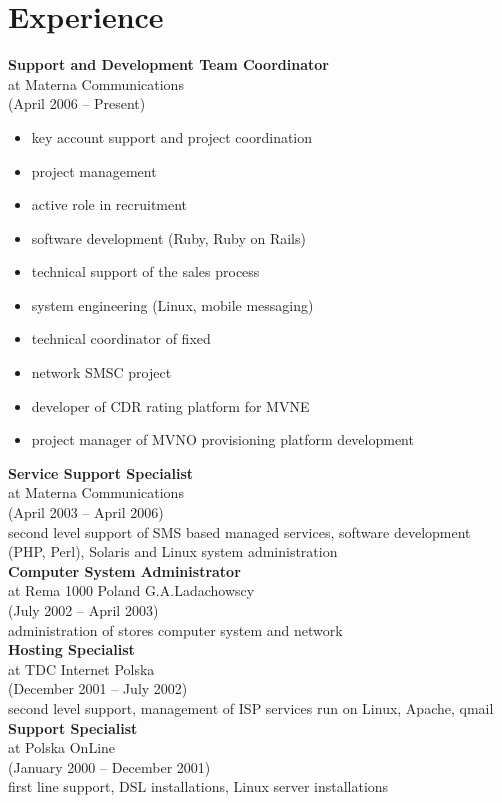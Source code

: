 \documentclass[9pt,a4paper,twocolumn]{extarticle}
\begin{document}
\section*{Experience}

{\bf Support and Development Team Coordinator}\\
at Materna Communications\\
(April 2006 – Present)
\begin{itemize}
\setlength{\itemsep}{0cm}%
\setlength{\parskip}{0cm}%
\item key account support and project coordination
\item project management
\item active role in recruitment
\item software development (Ruby, Ruby on Rails)
\item technical support of the sales process
\item system engineering (Linux, mobile messaging)
\item technical coordinator of ﬁxed 
\item network SMSC project
\item developer of CDR rating platform for MVNE
\item project manager of MVNO provisioning platform development 
\end{itemize}

{\bf Service Support Specialist}\\
at Materna Communications \\
(April 2003 – April 2006) \\
second level support of SMS based managed services, software development (PHP, Perl), Solaris and Linux system administration \\

{\bf Computer System Administrator }\\
at Rema 1000 Poland G.A.Ladachowscy \\
(July 2002 – April 2003) \\
administration of stores computer system and network \\

{\bf Hosting Specialist }\\
at TDC Internet Polska \\
(December 2001 – July 2002) \\
second level support, management of ISP services run on Linux, Apache, qmail \\

{\bf Support Specialist }\\
at Polska OnLine \\
(January 2000 – December 2001) \\
ﬁrst line support, DSL installations, Linux server installations\\
\end{document}
